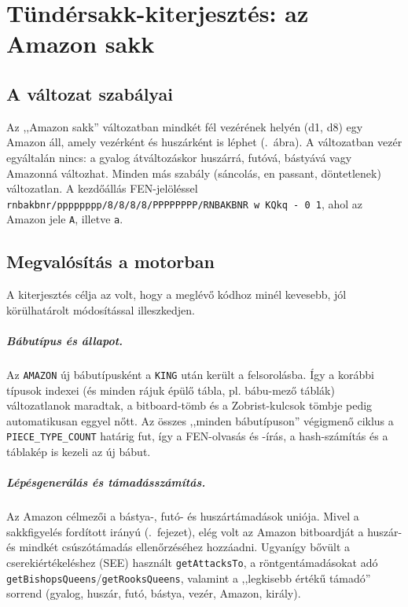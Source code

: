 \chapter{Tündérsakk-kiterjesztés: az Amazon sakk}\label{chap:amazon}

\section{A változat szabályai}

Az ,,Amazon sakk'' változatban mindkét fél vezérének helyén (d1, d8) egy Amazon áll, amely vezérként és huszárként is léphet (.~ábra). A változatban vezér egyáltalán nincs: a gyalog átváltozáskor huszárrá, futóvá, bástyává vagy Amazonná változhat. Minden más szabály (sáncolás, en passant, döntetlenek) változatlan. A kezdőállás FEN-jelöléssel \texttt{rnbakbnr/pppppppp/8/8/8/8/PPPPPPPP/RNBAKBNR w KQkq - 0 1}, ahol az Amazon jele \texttt{A}, illetve \texttt{a}.

\section{Megvalósítás a motorban}

A kiterjesztés célja az volt, hogy a meglévő kódhoz minél kevesebb, jól körülhatárolt módosítással illeszkedjen.

\paragraph{Bábutípus és állapot.} Az \texttt{AMAZON} új bábutípusként a \texttt{KING} után került a felsorolásba. Így a korábbi típusok indexei (és minden rájuk épülő tábla, pl. bábu-mező táblák) változatlanok maradtak, a bitboard-tömb és a Zobrist-kulcsok tömbje pedig automatikusan eggyel nőtt. Az összes ,,minden bábutípuson'' végigmenő ciklus a \texttt{PIECE\_TYPE\_COUNT} határig fut, így a FEN-olvasás és -írás, a hash-számítás és a táblakép is kezeli az új bábut.

\paragraph{Lépésgenerálás és támadásszámítás.} Az Amazon célmezői a bástya-, futó- és huszártámadások uniója. Mivel a sakkfigyelés fordított irányú (.~fejezet), elég volt az Amazon bitboardját a huszár- és mindkét csúszótámadás ellenőrzéséhez hozzáadni. Ugyanígy bővült a cserekiértékeléshez (SEE) használt \texttt{getAttacksTo}, a röntgentámadásokat adó \texttt{getBishopsQueens}/\texttt{getRooksQueens}, valamint a ,,legkisebb értékű támadó'' sorrend (gyalog, huszár, futó, bástya, vezér, Amazon, király).


